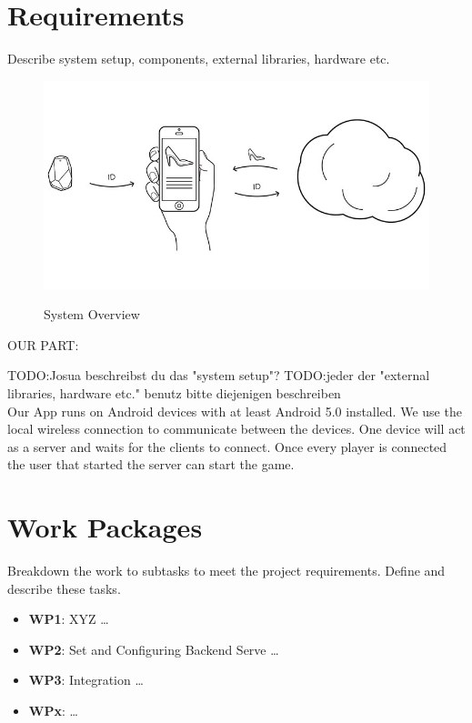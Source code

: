 \documentclass{report}
\newcommand{\lfig}[1]{\label{fig:#1}}
\begin{document}
\section{Requirements}
Describe system setup, components, external libraries, hardware etc.


\begin{figure}[h]
	\centering
    \includegraphics[width=\columnwidth]{overview.jpg}
    \lfig{system-overview}
    \vspace{-5mm} %
	\caption{System Overview~\cite{estimote}}
\end{figure}

OUR PART:

TODO:Josua beschreibst du das "system setup"?
TODO:jeder der "external libraries, hardware etc." benutz bitte diejenigen beschreiben
\\
Our App runs on Android devices with at least Android 5.0 installed. We use the local wireless connection to communicate between the devices. One device will act as a server and waits for the clients to connect. Once every player is connected the user that started the server can start the game.


\section{Work Packages}
Breakdown the work to subtasks to meet the project requirements.
Define and describe these tasks.

\begin{itemize}
        \item {\bf WP1}:  XYZ  \ldots    
        \item {\bf WP2}: Set and Configuring Backend Serve  \ldots    
        \item {\bf WP3}: Integration  \ldots 
         \item {\bf WPx}:  \ldots 
\end{itemize}
 
\end{document}
